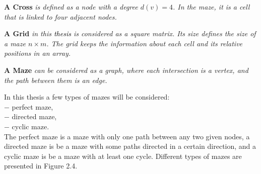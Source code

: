 \begin{definition}\textbf{A Cross} \emph{is defined as a node with a degree $d(v) = 4$. In the maze, it is a cell that is linked to four adjacent nodes. }\end{definition}
\begin{definition}\textbf{A Grid} \emph{in this \textcolor{black}{thesis} is considered as a square matrix. Its size defines the size of a maze $n \times m$. The grid keeps the information about each cell and its relative positions in an array.}\end{definition}
\begin{definition}\textbf{A Maze} \emph{can be considered as a graph, where each intersection is a vertex, and the path between them is an edge. }\end{definition}
\noindent In this thesis a few types of mazes will be considered:\\
$-$ perfect maze,\\
$-$ directed maze,\\
$-$ cyclic maze.\\
The perfect maze is a maze with only one path between any two given nodes, a directed maze is be a maze with some paths directed in a certain direction,
and a cyclic maze is be a maze with at least one cycle. Different types of mazes are presented in Figure 2.4.\\ 
